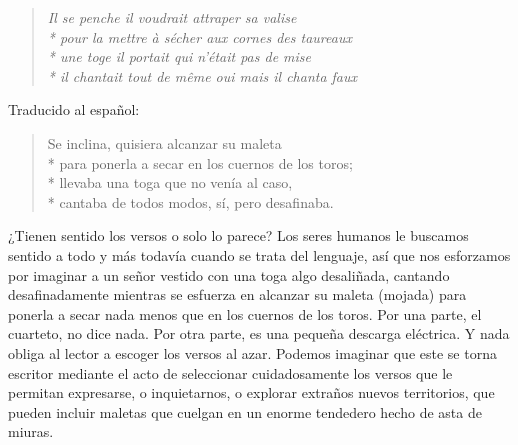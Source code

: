 \documentclass[11pt,a4paper]{article}
\begin{document}
%
%
%
%
%
%

\begin{verse}
\itshape
Il se penche il voudrait attraper sa valise\\*
pour la mettre à sécher aux cornes des taureaux\\*
une toge il portait qui n’était pas de mise\\*
il chantait tout de même oui mais il chanta faux
\end{verse}

Traducido al español:

\begin{verse}
Se inclina, quisiera alcanzar su maleta\\*
para ponerla a secar en los cuernos de los toros;\\*
llevaba una toga que no venía al caso,\\*
cantaba de todos modos, sí, pero desafinaba.
\end{verse}

¿Tienen sentido los versos o solo lo parece? Los seres humanos le buscamos sentido a todo y más todavía cuando se trata del lenguaje, así que nos esforzamos por imaginar a un señor vestido con una toga algo desaliñada, cantando desafinadamente mientras se esfuerza en alcanzar su maleta (mojada) para ponerla a secar nada menos que en los cuernos de los toros. Por una parte, el cuarteto, no dice nada. Por otra parte, es una pequeña descarga eléctrica. Y nada obliga al lector a escoger los versos al azar. Podemos imaginar que este se torna escritor mediante el acto de seleccionar cuidadosamente los versos que le permitan expresarse, o inquietarnos, o explorar extraños nuevos territorios, que pueden incluir maletas que cuelgan en un enorme tendedero hecho de asta de miuras. 
\end{document}
